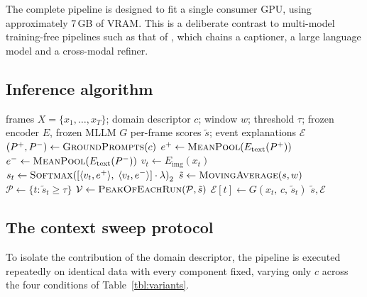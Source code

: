\documentclass[a4paper,fleqn]{cas-sc}
\begin{document}
The complete pipeline is designed to fit a single consumer GPU, using
approximately 7\,GB of VRAM. This is a deliberate contrast to multi-model
training-free pipelines such as that of \citet{zanella2024lavad}, which chains a
captioner, a large language model and a cross-modal refiner.

\subsection{Inference algorithm}
\begin{algorithm}[h]
\caption{DA-ZVAD inference for one sequence}
\label{alg:infer}
\begin{algorithmic}[1]
\Require frames $X = \{x_1,\dots,x_T\}$; domain descriptor $c$; window $w$;
         threshold $\tau$; frozen encoder $E$, frozen MLLM $G$
\Ensure per-frame scores $\tilde{s}$; event explanations $\mathcal{E}$
\State $(P^{+}, P^{-}) \gets \textproc{GroundPrompts}(c)$
\State $e^{+} \gets \textproc{MeanPool}(E_{\text{text}}(P^{+}))$
\State $e^{-} \gets \textproc{MeanPool}(E_{\text{text}}(P^{-}))$
    \State $v_t \gets E_{\text{img}}(x_t)$ 
    \State $s_t \gets \textproc{Softmax}\!\left(\left[\langle v_t, e^{+}\rangle,\;
           \langle v_t, e^{-}\rangle\right]\cdot\lambda\right)_{2}$
\EndFor
\State $\tilde{s} \gets \textproc{MovingAverage}(s, w)$ 
\State $\mathcal{P} \gets \{t : \tilde{s}_t \ge \tau\}$
\State $\mathcal{V} \gets \textproc{PeakOfEachRun}(\mathcal{P}, \tilde{s})$
    \State $\mathcal{E}[t] \gets G(x_t,\, c,\, \tilde{s}_t)$ 
\EndFor
\State \Return $\tilde{s}, \mathcal{E}$
\end{algorithmic}
\end{algorithm}

\subsection{The context sweep protocol}
\label{sec:sweep}
To isolate the contribution of the domain descriptor, the pipeline is executed
repeatedly on identical data with every component fixed, varying only $c$ across
the four conditions of Table~\ref{tbl:variants}.
\end{document}
